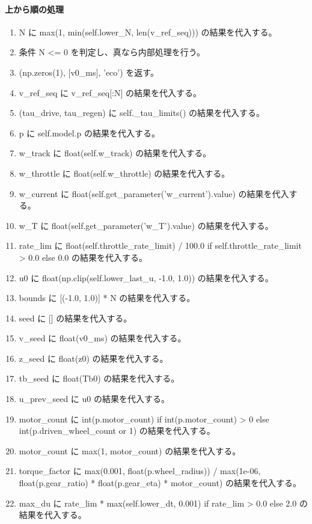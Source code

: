 \documentclass[a4paper,11pt]{article}
\begin{document}
            \paragraph{上から順の処理}
            \begin{enumerate}[leftmargin=1.8em]
            \item N に max(1, min(self.lower\_N, len(v\_ref\_seq))) の結果を代入する。
\item 条件 N <= 0 を判定し、真なら内部処理を行う。
\item   (np.zeros(1), [v0\_ms], 'eco') を返す。
\item v\_ref\_seq に v\_ref\_seq[:N] の結果を代入する。
\item (tau\_drive, tau\_regen) に self.\_tau\_limits() の結果を代入する。
\item p に self.model.p の結果を代入する。
\item w\_track に float(self.w\_track) の結果を代入する。
\item w\_throttle に float(self.w\_throttle) の結果を代入する。
\item w\_current に float(self.get\_parameter('w\_current').value) の結果を代入する。
\item w\_T に float(self.get\_parameter('w\_T').value) の結果を代入する。
\item rate\_lim に float(self.throttle\_rate\_limit) / 100.0 if self.throttle\_rate\_limit > 0.0 else 0.0 の結果を代入する。
\item u0 に float(np.clip(self.lower\_last\_u, -1.0, 1.0)) の結果を代入する。
\item bounds に [(-1.0, 1.0)] * N の結果を代入する。
\item seed に [] の結果を代入する。
\item v\_seed に float(v0\_ms) の結果を代入する。
\item z\_seed に float(z0) の結果を代入する。
\item tb\_seed に float(Tb0) の結果を代入する。
\item u\_prev\_seed に u0 の結果を代入する。
\item motor\_count に int(p.motor\_count) if int(p.motor\_count) > 0 else int(p.driven\_wheel\_count or 1) の結果を代入する。
\item motor\_count に max(1, motor\_count) の結果を代入する。
\item torque\_factor に max(0.001, float(p.wheel\_radius)) / max(1e-06, float(p.gear\_ratio) * float(p.gear\_eta) * motor\_count) の結果を代入する。
\item max\_du に rate\_lim * max(self.lower\_dt, 0.001) if rate\_lim > 0.0 else 2.0 の結果を代入する。

\end{enumerate}
\end{document}
